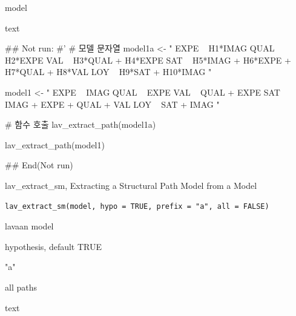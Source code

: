 \documentclass[a4paper]{book}
\begin{document}
%
\begin{Arguments}
\begin{ldescription}
\item[\code{model}] model
\end{ldescription}
\end{Arguments}
%
\begin{Value}
text
\end{Value}
%
\begin{Examples}
\begin{ExampleCode}

\#\# Not run: 
#'
# 모델 문자열
model1a <- "
EXPE ~ H1*IMAG
QUAL ~ H2*EXPE
VAL ~ H3*QUAL + H4*EXPE
SAT ~ H5*IMAG + H6*EXPE + H7*QUAL + H8*VAL
LOY ~ H9*SAT + H10*IMAG
"

model1 <- "
EXPE ~ IMAG
QUAL ~ EXPE
VAL ~ QUAL + EXPE
SAT ~ IMAG + EXPE + QUAL + VAL
LOY ~ SAT + IMAG
"


# 함수 호출
lav_extract_path(model1a)

lav_extract_path(model1)


## End(Not run)


\end{ExampleCode}
\end{Examples}
%
\begin{Description}
lav\_extract\_sm, Extracting a Structural Path Model from a Model
\end{Description}
%
\begin{Usage}
\begin{verbatim}
lav_extract_sm(model, hypo = TRUE, prefix = "a", all = FALSE)
\end{verbatim}
\end{Usage}
%
\begin{Arguments}
\begin{ldescription}
\item[\code{model}] lavaan model

\item[\code{hypo}] hypothesis, default TRUE

\item[\code{prefix}] "a"

\item[\code{all}] all paths
\end{ldescription}
\end{Arguments}
%
\begin{Value}
text
\end{Value}
\end{document}
